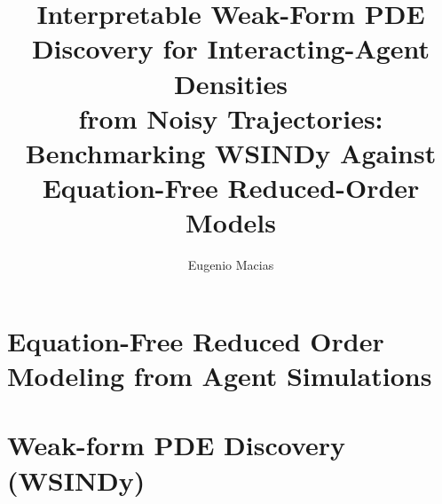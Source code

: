 \documentclass{report}
\title{Interpretable Weak-Form PDE Discovery for Interacting-Agent Densities\\
from Noisy Trajectories: Benchmarking WSINDy Against Equation-Free Reduced-Order Models}
\author{Eugenio Macias}
\date{} %
\theoremstyle{plain}
\theoremstyle{remark}
\numberwithin{equation}{section}              %
\begin{document}





\clearpage
\tableofcontents



\clearpage
{}



\part{Equation-Free Reduced Order Modeling from Agent Simulations}













\part{Weak-form PDE Discovery (WSINDy)}





\end{document}

